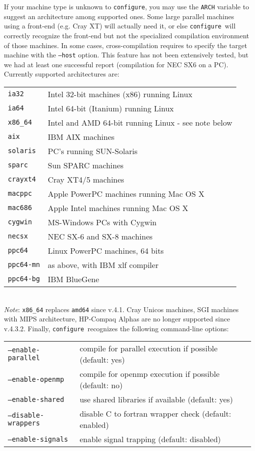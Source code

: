\documentclass[12pt,a4paper]{article}
\def\version{4.3.2}
\def\configure{\texttt{configure}}
\begin{document}
If your machine type is unknown to \configure, you may use the 
\texttt{ARCH}
variable to suggest an architecture among supported ones. Some large
parallel machines using a front-end (e.g. Cray XT) will actually
need it, or else \configure\ will correctly recognize the front-end
but not the specialized compilation environment of those
machines. In some cases, cross-compilation requires to specify the target machine with the
\texttt{--host} option. This feature has not been extensively
tested, but we had at least one successful report (compilation 
for NEC SX6 on a PC). Currently supported architectures are:\\
\begin{tabular}{ll}
\texttt{ia32}&    Intel 32-bit machines (x86) running Linux\\
\texttt{ia64}&    Intel 64-bit (Itanium) running Linux\\
\texttt{x86\_64}&  Intel and AMD 64-bit running Linux - see note below\\
\texttt{aix}&     IBM AIX machines\\
\texttt{solaris}& PC's running SUN-Solaris\\
\texttt{sparc}&   Sun SPARC machines\\
\texttt{crayxt4}& Cray XT4/5 machines\\
\texttt{macppc}&  Apple PowerPC machines running Mac OS X\\
\texttt{mac686}&  Apple Intel machines running Mac OS X\\
\texttt{cygwin}&  MS-Windows PCs with Cygwin\\
\texttt{necsx}&   NEC SX-6 and SX-8 machines\\
\texttt{ppc64}&   Linux PowerPC machines, 64 bits\\
\texttt{ppc64-mn}&as above, with IBM xlf compiler\\
\texttt{ppc64-bg}&IBM BlueGene
\end{tabular}\\
{\em Note}: \texttt{x86\_64} replaces \texttt{amd64} since v.4.1. 
Cray Unicos machines, SGI 
machines with MIPS architecture, HP-Compaq Alphas are no longer supported
since v.\version.
Finally, \configure\ recognizes the following command-line options:\\
\begin{tabular}{ll}
\texttt{--enable-parallel}&     compile for parallel execution if possible (default: yes)\\
\texttt{--enable-openmp}&       compile for openmp execution if possible (default: no)\\
\texttt{--enable-shared}&       use shared libraries if available (default: yes)\\
\texttt{--disable-wrappers}&    disable C to fortran wrapper check (default: enabled)\\
\texttt{--enable-signals}&      enable signal trapping (default: disabled)\\
\end{tabular}\\
\end{document}
